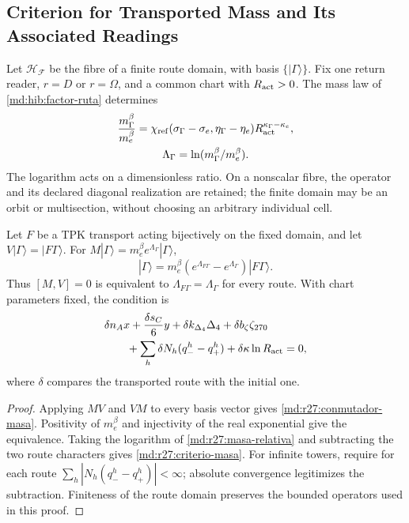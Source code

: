 \subsection{Criterion for Transported Mass and Its Associated Readings}
Let $\mathcal H_{\mathcal F}$ be the fibre of a finite route domain, with
basis $\{|\Gamma\rangle\}$. Fix one return reader, $r=D$ or $r=\Omega$,
and a common chart with $R_{\rm act}>0$.
The mass law of \eqref{md:hib:factor-ruta} determines
\begin{equation}
 \begin{gathered}
 \frac{m_\Gamma^\beta}{m_e^\beta}
 =\chi_{\rm ref}(\sigma_\Gamma-\sigma_e,\eta_\Gamma-\eta_e)
 R_{\rm act}^{\kappa_\Gamma-\kappa_e},\\
 \Lambda_\Gamma=\ln(m_\Gamma^\beta/m_e^\beta).
 \end{gathered}
 \label{md:r27:masa-relativa}
\end{equation}
The logarithm acts on a dimensionless ratio. On a nonscalar fibre, the
operator and its declared diagonal realization are retained; the finite domain
may be an orbit or multisection, without choosing an arbitrary individual cell.

\begin{theorem}
Let $F$ be a TPK transport acting bijectively on the fixed domain, and let
$V|\Gamma\rangle=|F\Gamma\rangle$. For
$M|\Gamma\rangle=m_e^\beta e^{\Lambda_\Gamma}|\Gamma\rangle$,
\begin{equation}
 [M,V]|\Gamma\rangle=m_e^\beta
 (e^{\Lambda_{F\Gamma}}-e^{\Lambda_\Gamma})|F\Gamma\rangle.
 \label{md:r27:conmutador-masa}
\end{equation}
Thus $[M,V]=0$ is equivalent to $\Lambda_{F\Gamma}=\Lambda_\Gamma$ for
every route. With chart parameters fixed, the condition is
\begin{equation}
 \begin{aligned}
 &\delta n_A x+\frac{\delta s_C}{6}y+
 \delta k_{\Delta_4}\Delta_4+\delta b_\zeta\zeta_{270}\\
 &\qquad+\sum_h\delta N_h(q_-^h-q_+^h)
 +\delta\kappa\ln R_{\rm act}=0,
 \end{aligned}
 \label{md:r27:criterio-masa}
\end{equation}
where $\delta$ compares the transported route with the initial one.
\end{theorem}
\begin{proof}
Applying $MV$ and $VM$ to every basis vector gives
\eqref{md:r27:conmutador-masa}. Positivity of $m_e^\beta$ and injectivity
of the real exponential give the equivalence. Taking the logarithm of
\eqref{md:r27:masa-relativa} and subtracting the two route characters gives
\eqref{md:r27:criterio-masa}. For infinite towers, require for each route
$\sum_h|N_h(q_-^h-q_+^h)|<\infty$; absolute convergence legitimizes
the subtraction. Finiteness of the route domain preserves the bounded
operators used in this proof.
\end{proof}

